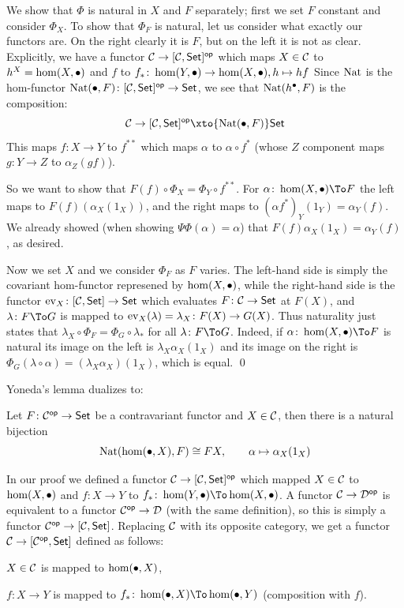     We show that $\Phi$ is natural in $X$ and $F$ separately; first we set $F$ constant and consider $\Phi_X$.
    To show that $\Phi_F$ is natural, let us consider what exactly our functors are.
    On the right clearly it is $F$, but on the left it is not as clear.
    Explicitly, we have a functor ${{\cal C}}\to[{{\cal C}},{\sf Set}]^{\sf op}$ which maps $X\in{{\cal C}}$ to $h^X=\hom(X,\bullet)$ and $f$ to $f_*\colon\hom(Y,\bullet)\to\hom(X,\bullet),h\mapsto hf$
    Since ${\rm Nat}$ is the hom-functor ${\rm Nat}(\bullet,F)\colon[{{\cal C}},{\sf Set}]^{\sf op}\to{\sf Set}$, we see that ${\rm Nat}(h^\bullet,F)$ is the composition:
    $$ \C \to [\C,\Set]^\op \xto{\nat(\bul,F)} \Set $$
    This maps $f\colon X\to Y$ to $f^{**}$ which maps $\alpha$ to $\alpha\circ f^*$ (whose $Z$ component maps $g\colon Y\to Z$ to $\alpha_Z(gf)$).

    So we want to show that $F(f)\circ\Phi_X=\Phi_Y\circ f^{**}$.
    For $\alpha\colon\hom(X,\bul)\To F$ the left maps to $F(f)(\alpha_X(1_X))$, and the right maps to $(\alpha f^*)_Y(1_Y)=\alpha_Y(f)$.
    We already showed (when showing $\Psi\Phi(\alpha)=\alpha$) that $F(f)\alpha_X(1_X)=\alpha_Y(f)$, as desired.

    Now we set $X$ and we consider $\Phi_F$ as $F$ varies.
    The left-hand side is simply the covariant hom-functor represened by $\hom(X,\bullet)$, while the right-hand side is the functor ${\rm ev}_X\colon[{{\cal C}},{\sf Set}]\to{\sf Set}$
    which evaluates $F\colon{{\cal C}}\to{\sf Set}$ at $F(X)$, and $\lambda\colon F\To G$ is mapped to ${\rm ev}_X(\lambda)=\lambda_X\colon F(X)\to G(X)$.
    Thus naturality just states that $\lambda_X\circ\Phi_F=\Phi_G\circ\lambda_*$ for all $\lambda\colon F\To G$.
    Indeed, if $\alpha\colon\hom(X,\bul)\To F$ is natural its image on the left is $\lambda_X\alpha_X(1_X)$ and its image on the right is $\Phi_G(\lambda\circ\alpha)=(\lambda_X\alpha_X)(1_X)$,
    which is equal.
    \qed

\eproof

Yoneda's lemma dualizes to:

\bcoro

    Let $F\colon{{\cal C}}^{\sf op}\to{\sf Set}$ be a contravariant functor and $X\in{{\cal C}}$, then there is a natural bijection
    $$ {\rm Nat}(\hom(\bullet,X),F) \cong FX,\qquad \alpha\mapsto\alpha_X(1_X) $$

\ecoro

In our proof we defined a functor ${{\cal C}}\to[{{\cal C}},{\sf Set}]^{\sf op}$ which mapped $X\in{{\cal C}}$ to $\hom(X,\bullet)$ and $f\colon X\to Y$ to $f_*\colon\hom(Y,\bul)\To\hom(X,\bul)$.
A functor ${{\cal C}}\to{{\cal D}}^{\sf op}$ is equivalent to a functor ${{\cal C}}^{\sf op}\to{{\cal D}}$ (with the same definition), so this is simply a functor ${{\cal C}}^{\sf op}\to[{{\cal C}},{\sf Set}]$.
Replacing ${{\cal C}}$ with its opposite category, we get a functor ${{\cal C}}\to[{{\cal C}}^{\sf op},{\sf Set}]$ defined as follows:
\benum
    \item $X\in{{\cal C}}$ is mapped to $\hom(\bullet,X)$,
    \item $f\colon X\to Y$ is mapped to $f_*\colon\hom(\bul,X)\To\hom(\bul,Y)$ (composition with $f$).
\eenum

